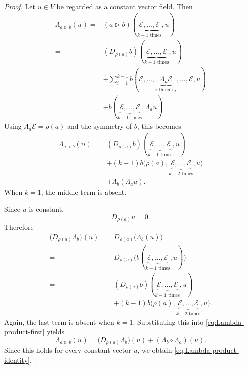 \documentclass[10pt,a4paper]{amsart}
\newcommand{\E}{\mathcal{E}}
\begin{document}
\begin{proof}
 Let \(u\in V\)
be regarded as a constant vector field. Then
\[
\begin{aligned}
\Lambda_{a\triangleright b}(u)
={}&
(a\triangleright b)
(\underbrace{\E,\ldots,\E}_{k-1\text{ times}},u)
\\
={}&
(D_{\rho(a)}b)
(\underbrace{\E,\ldots,\E}_{k-1\text{ times}},u)
\\
&+
\sum_{i=1}^{k-1}
b(\E,\ldots,
\underbrace{\Lambda_a\E}_{i\text{-th entry}},
\ldots,\E,u)
\\
&+
b(\underbrace{\E,\ldots,\E}_{k-1\text{ times}},
\Lambda_a u).
\end{aligned}
\]
Using \(\Lambda_a\E=\rho(a)\) and the symmetry of \(b\), this becomes
\begin{equation}
\begin{aligned}
\Lambda_{a\triangleright b}(u)
={}&
(D_{\rho(a)}b)
(\underbrace{\E,\ldots,\E}_{k-1\text{ times}},u)
\\
&+
(k-1)b\bigl(
\rho(a),
\underbrace{\E,\ldots,\E}_{k-2\text{ times}},
u
\bigr)
\\
&+
\Lambda_b(\Lambda_a u).
\end{aligned}
\label{eq:Lambda-product-first}
\end{equation}
When \(k=1\), the middle term is absent.

Since \(u\) is constant,
\[
D_{\rho(a)}u=0.
\]
Therefore
\[
\begin{aligned}
\bigl(D_{\rho(a)}\Lambda_b\bigr)(u)
={}&
D_{\rho(a)}\bigl(\Lambda_b(u)\bigr)
\\
={}&
D_{\rho(a)}
\bigl(
b(\underbrace{\E,\ldots,\E}_{k-1\text{ times}},u)
\bigr)
\\
={}&
(D_{\rho(a)}b)
(\underbrace{\E,\ldots,\E}_{k-1\text{ times}},u)
\\
&+
(k-1)b\bigl(
\rho(a),
\underbrace{\E,\ldots,\E}_{k-2\text{ times}},
u
\bigr).
\end{aligned}
\]
Again, the last term is absent when \(k=1\).
Substituting this into \eqref{eq:Lambda-product-first} yields
\[
\Lambda_{a\triangleright b}(u)
=
\bigl(D_{\rho(a)}\Lambda_b\bigr)(u)
+
(\Lambda_b\circ\Lambda_a)(u).
\]
Since this holds for every constant vector \(u\), we obtain
\eqref{eq:Lambda-product-identity}.
\end{proof}
\end{document}
